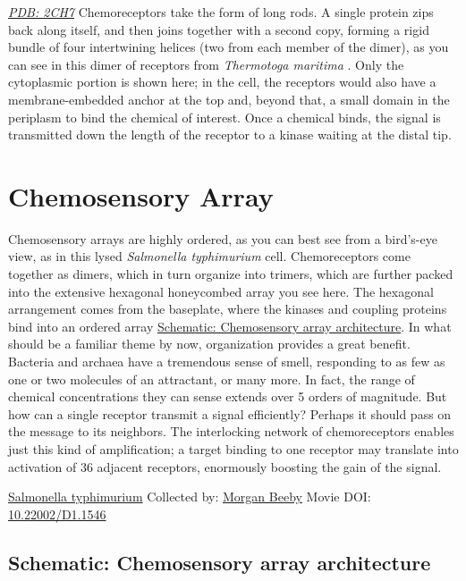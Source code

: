 \documentclass[]{tufte-book}
\begin{document}
\href{http://rcsb.org/structure/2CH7}{\emph{PDB: 2CH7}}
Chemoreceptors take the form of long rods. A single protein zips back along itself, and then joins together with a second copy, forming a rigid bundle of four intertwining helices (two from each member of the dimer), as you can see in this dimer of receptors from \emph{Thermotoga maritima} \citep{park2006}. Only the cytoplasmic portion is shown here; in the cell, the receptors would also have a membrane-embedded anchor at the top and, beyond that, a small domain in the periplasm to bind the chemical of interest. Once a chemical binds, the signal is transmitted down the length of the receptor to a kinase waiting at the distal tip.

\hypertarget{chemosensory-array}{%
\section{Chemosensory Array}\label{chemosensory-array}}

Chemosensory arrays are highly ordered, as you can best see from a bird's-eye view, as in this lysed \emph{Salmonella typhimurium} cell. Chemoreceptors come together as dimers, which in turn organize into trimers, which are further packed into the extensive hexagonal honeycombed array you see here. The hexagonal arrangement comes from the baseplate, where the kinases and coupling proteins bind into an ordered array \protect\hyperlink{Chemosensory_array_architecture}{Schematic: Chemosensory array architecture}. In what should be a familiar theme by now, organization provides a great benefit. Bacteria and archaea have a tremendous sense of smell, responding to as few as one or two molecules of an attractant, or many more. In fact, the range of chemical concentrations they can sense extends over 5 orders of magnitude. But how can a single receptor transmit a signal efficiently? Perhaps it should pass on the message to its neighbors. The interlocking network of chemoreceptors enables just this kind of amplification; a target binding to one receptor may translate into activation of 36 adjacent receptors, enormously boosting the gain of the signal.



\hypertarget{htmlwidget-123976c1e447846c2fa8}{}

\label{fig:7-2}\protect\hyperlink{tree}{Salmonella typhimurium} Collected by: \protect\hyperlink{morgan_beeby}{Morgan Beeby} Movie DOI: \href{https://doi.org/10.22002/D1.1546}{10.22002/D1.1546}

\hypertarget{Chemosensory_array_architecture}{%
\subsection*{Schematic: Chemosensory array architecture}\label{Chemosensory_array_architecture}}
\end{document}
